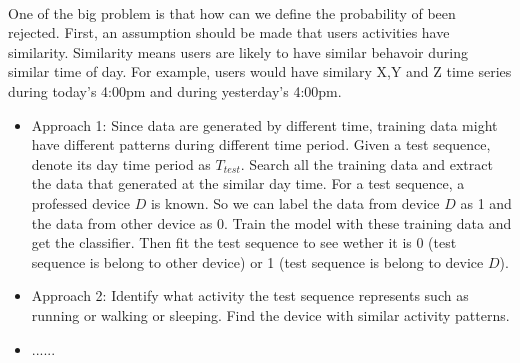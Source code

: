 \documentclass{article}
\begin{document}
	
	\paragraph{} One of the big problem is that how can we define the probability of been rejected. First, an assumption should be made that users activities have similarity. Similarity means users are likely to have similar behavoir during similar time of day. For example, users would have similary X,Y and Z time series during today's 4:00pm and during yesterday's 4:00pm. 
	
	
	\begin{itemize}
		\item Approach 1: Since data are generated by different time, training data might have different patterns during different time period. Given a test sequence, denote its day time period as $T_{test}$. Search all the training data and extract the data that generated at the similar day time. For a test sequence, a professed device $D$ is known. So we can label the data from device $D$ as 1 and the data from other device as 0. Train the model with these training data and get the classifier. Then fit the test sequence to see wether it is 0 (test sequence is belong to other device) or 1 (test sequence is belong to device $D$). 
		\item Approach 2: Identify what activity the test sequence represents such as running or walking or sleeping. Find the device with similar activity patterns.
		\item ......
	\end{itemize}
	
	
	
	
\end{document}
